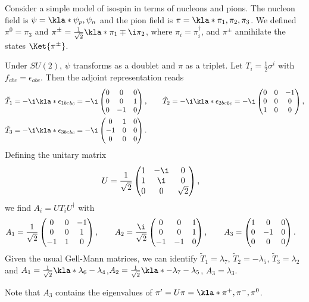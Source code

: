 \documentclass[english, parskip=full]{scrbook}
\newcommand{\example}[3]{\begin{tcolorbox}[colback=colorbackgroundexample,colframe=colorexample, breakable,enhanced,title={\textbf{#1}: #2.}]#3\end{tcolorbox}}
\begin{document}
\example{Global symmetry}{$SU(2)$}{
Consider a simple model of isospin in terms of nucleons and pions.
The nucleon field is $\psi=\kla*{\psi_p,\psi_n}$ and the pion field is $\pi=\kla*{\pi_1,\pi_2,\pi_3}$.
We defined $\pi^0=\pi_3$ and $\pi^\pm=\frac{1}{\sqrt{2}}\kla*{\pi_1\mp\i\pi_2}$, where $\pi_i=\pi_i^\dagger$, and $\pi^\pm$ annihilate the states $\Ket{\pi^\pm}$.

Under $SU(2)$, $\psi$ transforms as a doublet and $\pi$ as a triplet.
Let $T_i=\frac{1}{2}\sigma^i$ with $f_{abc}=\epsilon_{abc}$.
Then the adjoint representation reads
\begin{align}
\tilde{T}_1 &= -\i\kla*{\epsilon_{1bc}}_{bc} = -\i \begin{pmatrix}
0&0&0 \\ 0&0&1 \\ 0&-1&0
\end{pmatrix},\qquad
\tilde{T}_2 = -\i\kla*{\epsilon_{2bc}}_{bc} = -\i \begin{pmatrix}
0&0&-1 \\ 0&0&0 \\ 1&0&0
\end{pmatrix},\\
\tilde{T}_3 &= -\i\kla*{\epsilon_{3bc}}_{bc} = -\i \begin{pmatrix}
0&1&0 \\ -1&0&0 \\ 0&0&0
\end{pmatrix}.
\end{align}
Defining the unitary matrix
\begin{align}
U &= \frac{1}{\sqrt{2}}\begin{pmatrix}
1 & -\i & 0 \\ 1 & \i & 0 \\ 0 & 0 & \sqrt{2}
\end{pmatrix},
\end{align}
we find $A_i=UT_iU^\dagger$ with
\begin{align}
A_1 &= \frac{1}{\sqrt{2}} \begin{pmatrix}
0&0&-1 \\ 0&0&1 \\ -1&1&0
\end{pmatrix},\qquad
A_2 = \frac{\i}{\sqrt{2}} \begin{pmatrix}
0&0&1 \\ 0&0&1 \\ -1&-1&0
\end{pmatrix},\qquad
A_3 = \begin{pmatrix}
1&0&0 \\ 0&-1&0 \\ 0&0&0
\end{pmatrix}.
\end{align}
Given the usual Gell-Mann matrices, we can identify $\tilde{T}_1=\lambda_7$, $\tilde{T}_2=-\lambda_5$, $\tilde{T}_3=\lambda_2$ and $A_1=\frac{1}{\sqrt{2}}\kla*{\lambda_6-\lambda_4}$,$A_2=\frac{1}{\sqrt{2}}\kla*{-\lambda_7-\lambda_5}$, $A_3=\lambda_3$.

Note that $A_3$ contains the eigenvalues of $\pi'=U\pi=\kla*{\pi^+,\pi^-,\pi^0}$.
}
\end{document}
